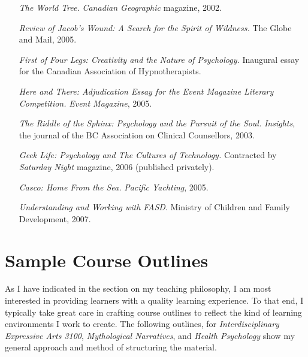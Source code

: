 \documentclass[10pt,DIV09,letterpaper,oneside,headsepline]{scrreprt}
\begin{document}
\begin{flushleft}
\begin{itemize}
\item [\textit{The World Tree.}] \textit{Canadian Geographic}
magazine, 2002.

\item [\textit{Review of \textit{Jacob's Wound: A Search for the
Spirit of Wildness}.}] The Globe and Mail, 2005.

\item [\textit{First of Four Legs: Creativity and the Nature of
Psychology.}] Inaugural essay for the Canadian Association of
Hypnotherapists.

\item [\textit{Here and There: Adjudication Essay for the Event
Magazine Literary Competition.}] \textit{Event Magazine}, 2005.

\item [\textit{The Riddle of the Sphinx: Psychology and the Pursuit
of the Soul.}] \textit{Insights}, the journal of the BC
Association on Clinical Counsellors, 2003.

\item [\textit{Geek Life: Psychology and The Cultures of
Technology.}] Contracted by \textit{Saturday Night} magazine,
2006 (published privately).

\item [\textit{Casco: Home From the Sea.}] \textit{Pacific
Yachting}, 2005.

\item [\textit{Understanding and Working with FASD}.] Ministry of
Children and Family Development, 2007.

\end{itemize}
\end{flushleft}

\chapter{Sample Course Outlines}

As I have indicated in the section on my teaching philosophy, I am most interested in providing learners with a quality learning experience. To that end, I typically take great care in crafting course outlines to reflect the kind of learning environments I work to create. The following outlines, for \textit{Interdisciplinary Expressive Arts 3100}, \textit{Mythological Narratives}, and \textit{Health Psychology} show my general approach and method of structuring the material.
\end{document}
